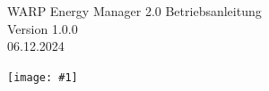 \documentclass[a4paper,10pt]{article}
\title{}
\author{}
\newcommand{\gfx}[1]{\texttt{[image: \#1]}}
\begin{document}
\pagestyle{empty}
\begin{titlepage}
	\vspace*{-3.08cm}
	\colorbox{boxgray}{}
	\vfill
	\begin{center}
		\Huge
        \color{white}
		WARP Energy Manager 2.0 Betriebsanleitung\\\vspace{1cm}
		\large
		Version 1.0.0\\\vspace{0.25cm}
		06.12.2024
	\end{center}
	\vspace*{1cm} \gfx{./img_v2/warp-energy-manager2.png}
    \vfill
   	\pagecolor{covergray}

\end{titlepage}
\newpage
\pagecolor{white}
\null
\newpage
\pagestyle{fancy}
\end{document}
